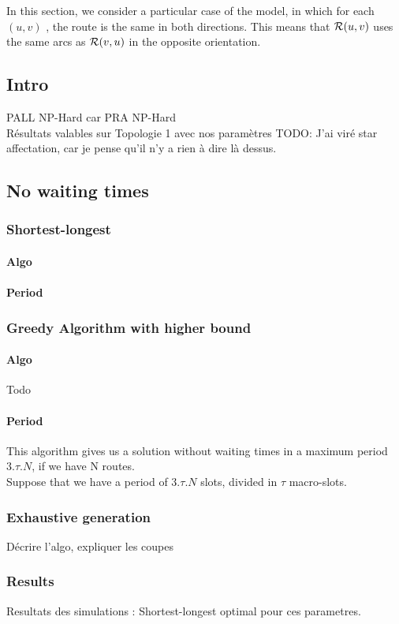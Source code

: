 \documentclass[a4paper,10pt]{article}
\newcommand{\todo}[1]{{\color{red} TODO: {#1}}}
\begin{document}
  In this section, we consider a particular case of the model, in which for each $(u,v)$ , the route is the same in both directions. This means that ${\cal R}(u,v)$ uses the same arcs as ${\cal R}(v,u)$ in the opposite orientation.
  \subsection{Intro}
    PALL NP-Hard car PRA NP-Hard\\
    Résultats valables sur Topologie 1 avec nos paramètres
    \todo{J'ai viré star affectation, car je pense qu'il n'y a rien à dire là dessus.}
    
  \subsection{No waiting times}
    \subsubsection{Shortest-longest}
      \paragraph{Algo}
      \paragraph{Period}
    \subsubsection{Greedy Algorithm with higher bound}
      \paragraph{Algo}
	Todo
      \paragraph{Period}
	This algorithm gives us a solution without waiting times in a maximum period $3.\tau.N$, if we have N routes.\\
	Suppose that we have a period of $3.\tau.N$ slots, divided in $\tau$ macro-slots.
    \subsubsection{Exhaustive generation}
      Décrire l'algo, expliquer les coupes
    \subsubsection{Results}
      Resultats des simulations : Shortest-longest optimal pour ces parametres.
      
\end{document}
